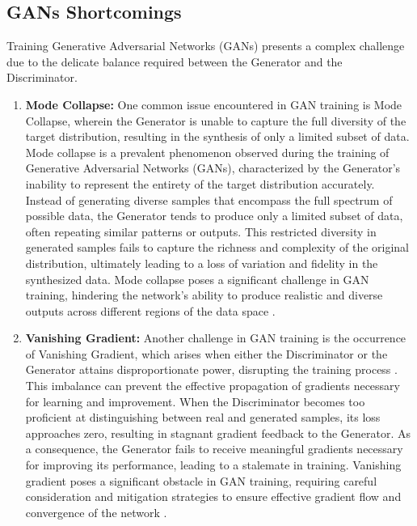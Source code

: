 \documentclass[UKenglish,12pt]{master-style}
\begin{document}
\subsection{GANs Shortcomings}

Training Generative Adversarial Networks (GANs) presents a complex challenge due to the delicate balance required between the Generator and the Discriminator. 
\begin{enumerate}
    
\item \textbf{{Mode Collapse:}} One common issue encountered in GAN training is Mode Collapse, wherein the Generator is unable to capture the full diversity of the target distribution, resulting in the synthesis of only a limited subset of data. Mode collapse is a prevalent phenomenon observed during the training of Generative Adversarial Networks (GANs), characterized by the Generator's inability to represent the entirety of the target distribution accurately. Instead of generating diverse samples that encompass the full spectrum of possible data, the Generator tends to produce only a limited subset of data, often repeating similar patterns or outputs. This restricted diversity in generated samples fails to capture the richness and complexity of the original distribution, ultimately leading to a loss of variation and fidelity in the synthesized data. Mode collapse poses a significant challenge in GAN training, hindering the network's ability to produce realistic and diverse outputs across different regions of the data space \cite{Kundu_2019_ICCV} .

\item \textbf{{Vanishing Gradient:}} Another challenge in GAN training is the occurrence of Vanishing Gradient, which arises when either the Discriminator or the Generator attains disproportionate power, disrupting the training process \cite{Kundu_2019_ICCV} . This imbalance can prevent the effective propagation of gradients necessary for learning and improvement. When the Discriminator becomes too proficient at distinguishing between real and generated samples, its loss approaches zero, resulting in stagnant gradient feedback to the Generator. As a consequence, the Generator fails to receive meaningful gradients necessary for improving its performance, leading to a stalemate in training. Vanishing gradient poses a significant obstacle in GAN training, requiring careful consideration and mitigation strategies to ensure effective gradient flow and convergence of the network \cite{Kundu_2019_ICCV} .
\end{enumerate}
\end{document}
